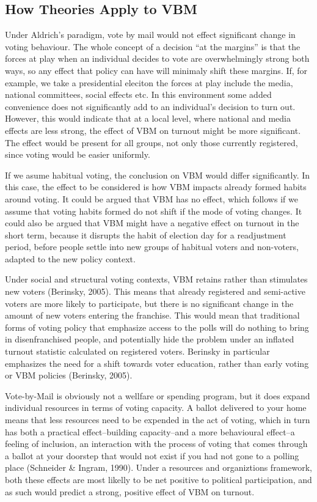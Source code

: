 \documentclass[12pt,twoside]{reedthesis}
\begin{document}
  \subsection{How Theories Apply to VBM}\label{how-theories-apply-to-vbm}
  
  Under Aldrich's paradigm, vote by mail would not effect significant
  change in voting behaviour. The whole concept of a decision ``at the
  margins'' is that the forces at play when an individual decides to vote
  are overwhelmingly strong both ways, so any effect that policy can have
  will minimaly shift these margins. If, for example, we take a
  presidential eleciton the forces at play include the media, national
  committees, social effects etc. In this environment some added
  convenience does not significantly add to an individual's decision to
  turn out. However, this would indicate that at a local level, where
  national and media effects are less strong, the effect of VBM on turnout
  might be more significant. The effect would be present for all groups,
  not only those currently registered, since voting would be easier
  uniformly.
  
  If we asume habitual voting, the conclusion on VBM would differ
  significantly. In this case, the effect to be considered is how VBM
  impacts already formed habits around voting. It could be argued that VBM
  has no effect, which follows if we assume that voting habits formed do
  not shift if the mode of voting changes. It could also be argued that
  VBM might have a negative effect on turnout in the short term, because
  it disrupts the habit of election day for a readjustment period, before
  people settle into new groups of habitual voters and non-voters, adapted
  to the new policy context.
  
  Under social and structural voting contexts, VBM retains rather than
  stimulates new voters (Berinsky, 2005). This means that already
  registered and semi-active voters are more likely to participate, but
  there is no significant change in the amount of new voters entering the
  franchise. This would mean that traditional forms of voting policy that
  emphasize access to the polls will do nothing to bring in
  disenfranchised people, and potentially hide the problem under an
  inflated turnout statistic calculated on registered voters. Berinsky in
  particular emphasizes the need for a shift towards voter education,
  rather than early voting or VBM policies (Berinsky, 2005).
  
  Vote-by-Mail is obviously not a wellfare or spending program, but it
  does expand individual resources in terms of voting capacity. A ballot
  delivered to your home means that less resources need to be expended in
  the act of voting, which in turn has both a practical effect--building
  capacity--and a more behavioural effect--a feeling of inclusion, an
  interaction with the process of voting that comes through a ballot at
  your doorstep that would not exist if you had not gone to a polling
  place (Schneider \& Ingram, 1990). Under a resources and organiztions
  framework, both these effects are most likelly to be net positive to
  political participation, and as such would predict a strong, positive
  effect of VBM on turnout.
  
\end{document}
